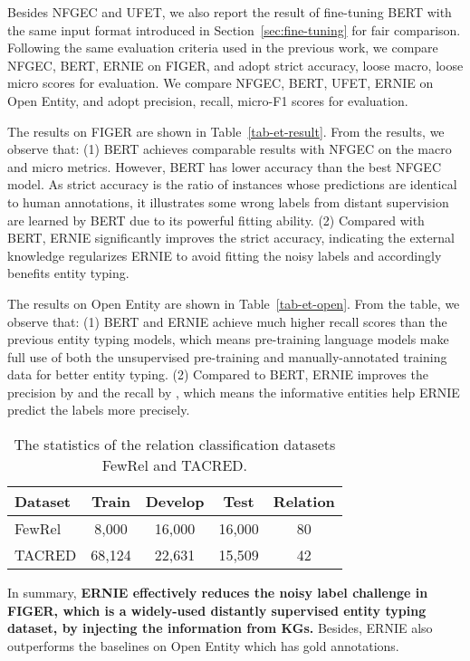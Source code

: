 \documentclass[11pt,a4paper]{article}
\begin{document}
Besides NFGEC and UFET, we also report the result of fine-tuning BERT with the same input format introduced in Section~\ref{sec:fine-tuning} for fair comparison. Following the same evaluation criteria used in the previous work, we compare NFGEC, BERT, ERNIE on FIGER, and adopt strict accuracy, loose macro, loose micro scores for evaluation. We compare NFGEC, BERT, UFET, ERNIE on Open Entity, and adopt precision, recall, micro-F1 scores for evaluation.

The results on FIGER are shown in Table~\ref{tab-et-result}. From the results, we observe that: (1) BERT achieves comparable results with NFGEC on the macro and micro metrics. However, BERT has lower accuracy than the best NFGEC model. As strict accuracy is the ratio of instances whose predictions are identical to human annotations, it illustrates some wrong labels from distant supervision are learned by BERT due to its powerful fitting ability. (2) Compared with BERT, ERNIE significantly improves the strict accuracy, indicating the external knowledge regularizes ERNIE to avoid fitting the noisy labels and accordingly benefits entity typing.

The results on Open Entity are shown in Table~\ref{tab-et-open}. From the table, we observe that: (1) BERT and ERNIE achieve much higher recall scores than the previous entity typing models, which means pre-training language models make full use of both the unsupervised pre-training and manually-annotated training data for better entity typing. (2) Compared to BERT, ERNIE improves the precision by  and the recall by , which means the informative entities help ERNIE predict the labels more precisely.



\begin{table}[t]
\centering
\scriptsize
\begin{tabular}{lcccc}
  \toprule
  Dataset & Train & Develop & Test & Relation \\
  \midrule
  FewRel & 8,000 & 16,000  & 16,000 & 80 \\
  TACRED & 68,124 & 22,631 & 15,509 & 42 \\
  \bottomrule
\end{tabular}
\caption{The statistics of the relation classification datasets FewRel and TACRED.}
\label{tab-re}
\vspace{-3mm}
\end{table}

In summary, \textbf{ERNIE effectively reduces the noisy label challenge in FIGER, which is a widely-used distantly supervised entity typing dataset, by injecting the information from KGs.} Besides, ERNIE also outperforms the baselines on Open Entity which has gold annotations. 
\end{document}
